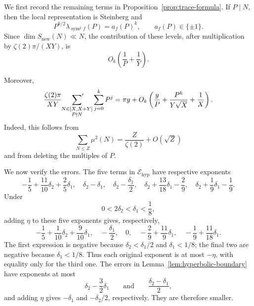 \documentclass[12pt,reqno]{amsart}
\numberwithin{equation}{section}
\theoremstyle{plain}
\theoremstyle{definition}
\theoremstyle{remark}
\newcommand{\sym}{\operatorname{sym}}
\begin{document}
We first record the remaining terms in Proposition~\ref{prop:trace-formula}.
If $P\mid N$, then the local representation is Steinberg and
\[
P^{k/2}\lambda_{\sym^k f}(P)=a_f(P)^k,
\qquad
a_f(P)\in\{\pm1\}.
\]
Since $\dim S_{\mathrm{new}}(N)\ll N$, the contribution of these levels, after multiplication by $\zeta(2)\pi/(XY)$, is
\begin{equation}\label{eq:ramified-levels}
O_k\left(\frac1P+\frac1Y\right).
\end{equation}

Moreover,
\begin{equation}\label{eq:elementary-term}
\frac{\zeta(2)\pi}{XY}
\sideset{}{'}\sum_{\substack{N\in[X,X+Y]\\P\nmid N}}
\sum_{j=0}^kP^j
=
\pi y
+
O_k\left(
\frac{y}{P}
+
\frac{P^k}{Y\sqrt X}
+
\frac1X
\right).
\end{equation}
Indeed, this follows from
\[
\sum_{N\leq Z}\mu^2(N)=\frac{Z}{\zeta(2)}+O(\sqrt Z)
\]
and from deleting the multiples of $P$.

We now verify the errors.
The five terms in $\mathcal E_{\mathrm{hyp}}$ have respective exponents
\[
-\frac15+\frac{11}{10}\delta_2+\frac25\delta_1,\quad
\delta_2-\delta_1,\quad
\delta_2-\frac{\delta_1}{2},\quad
\delta_2+\frac{13}{18}\delta_1-\frac29,\quad
\delta_2+\frac19\delta_1-\frac19.
\]
Under
\[
0<2\delta_2<\delta_1<\frac18,
\]
adding $\eta$ to these five exponents gives, respectively,
\[
-\frac15+\frac1{10}\delta_2+\frac9{10}\delta_1,\quad
-\frac{\delta_1}{2},\quad
0,\quad
-\frac29+\frac{11}{9}\delta_1,\quad
-\frac19+\frac{11}{18}\delta_1.
\]
The first expression is negative because $\delta_2<\delta_1/2$ and $\delta_1<1/8$; the final two are negative because $\delta_1<1/8$.
Thus each original exponent is at most $-\eta$, with equality only for the third one.
The errors in Lemma~\ref{lem:hyperbolic-boundary} have exponents at most
\[
\delta_2-\frac32\delta_1
\qquad\text{and}\qquad
\frac{\delta_2-\delta_1}{2},
\]
and adding $\eta$ gives $-\delta_1$ and $-\delta_2/2$, respectively.
They are therefore smaller.
\end{document}
